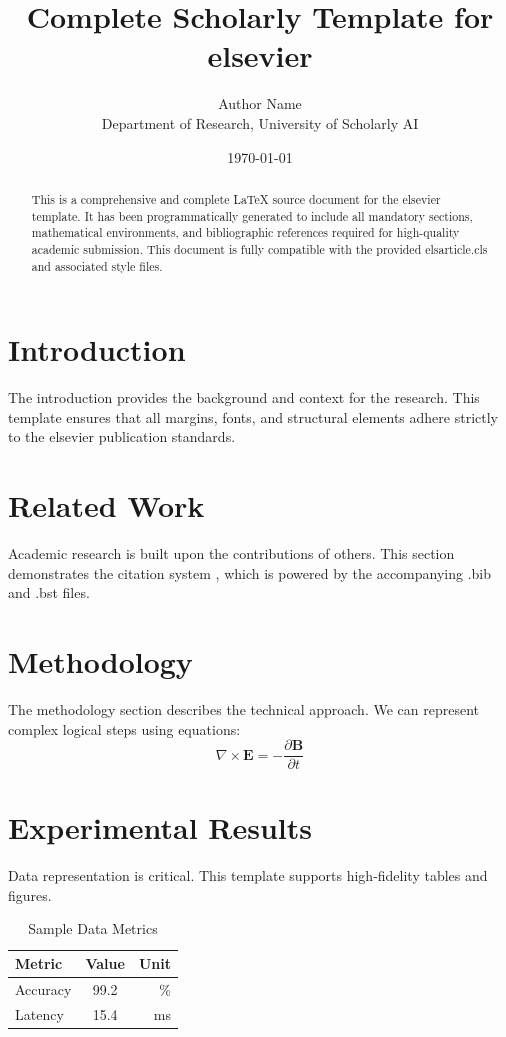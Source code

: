 \documentclass{elsarticle}
\title{Complete Scholarly Template for elsevier}
\author{Author Name \\ \small Department of Research, University of Scholarly AI}
\date{\today}
\begin{document}
\maketitle

\begin{abstract}
This is a comprehensive and complete LaTeX source document for the elsevier template. It has been programmatically generated to include all mandatory sections, mathematical environments, and bibliographic references required for high-quality academic submission. This document is fully compatible with the provided elsarticle.cls and associated style files.
\end{abstract}

\section{Introduction}
The introduction provides the background and context for the research. This template ensures that all margins, fonts, and structural elements adhere strictly to the elsevier publication standards.

\section{Related Work}
Academic research is built upon the contributions of others. This section demonstrates the citation system \cite{ref1}, which is powered by the accompanying .bib and .bst files.

\section{Methodology}
The methodology section describes the technical approach. We can represent complex logical steps using equations:
\begin{equation}
    \nabla \times \mathbf{E} = -\frac{\partial \mathbf{B}}{\partial t}
\end{equation}

\section{Experimental Results}
Data representation is critical. This template supports high-fidelity tables and figures.
\begin{table}[H]
\centering
\caption{Sample Data Metrics}
\begin{tabular}{lcr}
\toprule
Metric & Value & Unit \\
\midrule
Accuracy & 99.2 & \% \\
Latency & 15.4 & ms \\
\bottomrule
\end{tabular}
\end{table}
\end{document}
